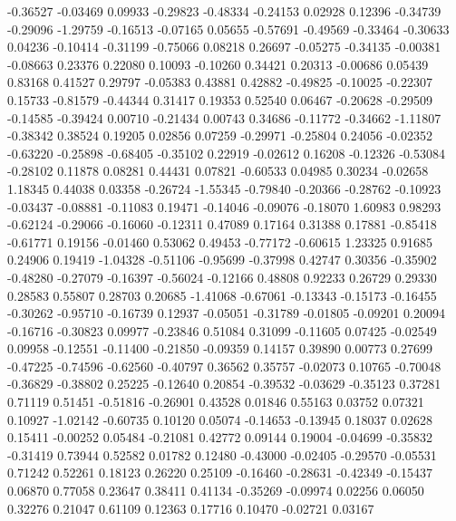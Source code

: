   -0.36527 -0.03469
   0.09933 -0.29823
  -0.48334 -0.24153
   0.02928  0.12396
  -0.34739 -0.29096
  -1.29759 -0.16513
  -0.07165  0.05655
  -0.57691 -0.49569
  -0.33464 -0.30633
   0.04236 -0.10414
  -0.31199 -0.75066
   0.08218  0.26697
  -0.05275 -0.34135
  -0.00381 -0.08663
   0.23376  0.22080
   0.10093 -0.10260
   0.34421  0.20313
  -0.00686  0.05439
   0.83168  0.41527
   0.29797 -0.05383
   0.43881  0.42882
  -0.49825 -0.10025
  -0.22307  0.15733
  -0.81579 -0.44344
   0.31417  0.19353
   0.52540  0.06467
  -0.20628 -0.29509
  -0.14585 -0.39424
   0.00710 -0.21434
   0.00743  0.34686
  -0.11772 -0.34662
  -1.11807 -0.38342
   0.38524  0.19205
   0.02856  0.07259
  -0.29971 -0.25804
   0.24056 -0.02352
  -0.63220 -0.25898
  -0.68405 -0.35102
   0.22919 -0.02612
   0.16208 -0.12326
  -0.53084 -0.28102
   0.11878  0.08281
   0.44431  0.07821
  -0.60533  0.04985
   0.30234 -0.02658
   1.18345  0.44038
   0.03358 -0.26724
  -1.55345 -0.79840
  -0.20366 -0.28762
  -0.10923 -0.03437
  -0.08881 -0.11083
   0.19471 -0.14046
  -0.09076 -0.18070
   1.60983  0.98293
  -0.62124 -0.29066
  -0.16060 -0.12311
   0.47089  0.17164
   0.31388  0.17881
  -0.85418 -0.61771
   0.19156 -0.01460
   0.53062  0.49453
  -0.77172 -0.60615
   1.23325  0.91685
   0.24906  0.19419
  -1.04328 -0.51106
  -0.95699 -0.37998
   0.42747  0.30356
  -0.35902 -0.48280
  -0.27079 -0.16397
  -0.56024 -0.12166
   0.48808  0.92233
   0.26729  0.29330
   0.28583  0.55807
   0.28703  0.20685
  -1.41068 -0.67061
  -0.13343 -0.15173
  -0.16455 -0.30262
  -0.95710 -0.16739
   0.12937 -0.05051
  -0.31789 -0.01805
  -0.09201  0.20094
  -0.16716 -0.30823
   0.09977 -0.23846
   0.51084  0.31099
  -0.11605  0.07425
  -0.02549  0.09958
  -0.12551 -0.11400
  -0.21850 -0.09359
   0.14157  0.39890
   0.00773  0.27699
  -0.47225 -0.74596
  -0.62560 -0.40797
   0.36562  0.35757
  -0.02073  0.10765
  -0.70048 -0.36829
  -0.38802  0.25225
  -0.12640  0.20854
  -0.39532 -0.03629
  -0.35123  0.37281
   0.71119  0.51451
  -0.51816 -0.26901
   0.43528  0.01846
   0.55163  0.03752
   0.07321  0.10927
  -1.02142 -0.60735
   0.10120  0.05074
  -0.14653 -0.13945
   0.18037  0.02628
   0.15411 -0.00252
   0.05484 -0.21081
   0.42772  0.09144
   0.19004 -0.04699
  -0.35832 -0.31419
   0.73944  0.52582
   0.01782  0.12480
  -0.43000 -0.02405
  -0.29570 -0.05531
   0.71242  0.52261
   0.18123  0.26220
   0.25109 -0.16460
  -0.28631 -0.42349
  -0.15437  0.06870
   0.77058  0.23647
   0.38411  0.41134
  -0.35269 -0.09974
   0.02256  0.06050
   0.32276  0.21047
   0.61109  0.12363
   0.17716  0.10470
  -0.02721  0.03167
